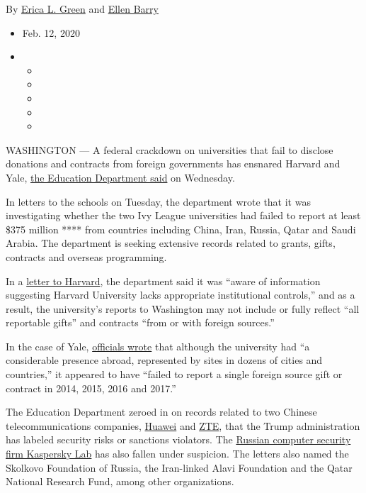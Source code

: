 By \href{https://nytimes.com/by/erica-l-green}{Erica L. Green} and
\href{https://www.nytimes.com/by/ellen-barry}{Ellen Barry}

\begin{itemize}
\item
  Feb. 12, 2020
\item
  \begin{itemize}
  \item
  \item
  \item
  \item
  \item
  \end{itemize}
\end{itemize}

WASHINGTON --- A federal crackdown on universities that fail to disclose
donations and contracts from foreign governments has ensnared Harvard
and Yale,
\href{https://content.govdelivery.com/accounts/USED/bulletins/27b7801}{the
Education Department said} on Wednesday.

In letters to the schools on Tuesday, the department wrote that it was
investigating whether the two Ivy League universities had failed to
report at least \$375 million **** from countries including China, Iran,
Russia, Qatar and Saudi Arabia. The department is seeking extensive
records related to grants, gifts, contracts and overseas programming.

In a
\href{https://www2.ed.gov/policy/highered/leg/harvard-20200211.pdf}{letter
to Harvard}, the department said it was ``aware of information
suggesting Harvard University lacks appropriate institutional
controls,'' and as a result, the university's reports to Washington may
not include or fully reflect ``all reportable gifts'' and contracts
``from or with foreign sources.''

In the case of Yale,
\href{https://www2.ed.gov/policy/highered/leg/yale-20200211.pdf}{officials
wrote} that although the university had ``a considerable presence
abroad, represented by sites in dozens of cities and countries,'' it
appeared to have ``failed to report a single foreign source gift or
contract in 2014, 2015, 2016 and 2017.''

The Education Department zeroed in on records related to two Chinese
telecommunications companies,
\href{https://www.nytimes.com/2020/02/11/us/politics/white-house-huawei-back-door.html}{Huawei}
and
\href{https://www.nytimes.com/2018/06/07/business/what-is-zte.html}{ZTE},
that the Trump administration has labeled security risks or sanctions
violators. The
\href{https://www.nytimes.com/2017/09/13/us/politics/kaspersky-lab-antivirus-federal-government.html}{Russian
computer security firm Kaspersky Lab} has also fallen under suspicion.
The letters also named the Skolkovo Foundation of Russia, the
Iran-linked Alavi Foundation and the Qatar National Research Fund, among
other organizations.

